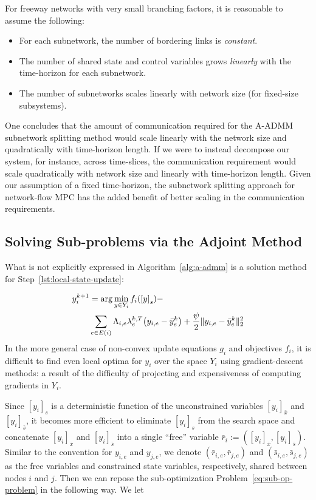 For freeway networks with very small branching factors, it is reasonable to assume the following:

\begin{itemize}
	\item For each subnetwork, the number of bordering links is \emph{constant}.
	\item The number of shared state and control variables grows \emph{linearly} with the time-horizon for each subnetwork.
	\item The number of subnetworks scales linearly with network size (for fixed-size subsystems).
\end{itemize}

 One concludes that the amount of communication required for the A-ADMM subnetwork splitting method would scale linearly with the network size and quadratically with time-horizon length. If we were to instead decompose our system, for instance, across time-slices, the communication requirement would scale quadratically with network size and linearly with time-horizon length. Given our assumption of a fixed time-horizon, the subnetwork splitting approach for network-flow MPC has the added benefit of better scaling in the communication requirements.

\subsection{Solving Sub-problems via the Adjoint Method} %
\label{sec:minimizing_sub_objectives_using_the_adjoint_method}

What is not explicitly expressed in Algorithm~\ref{alg:a-admm} is a solution method for Step~\ref{lst:local-state-update}:

\begin{align}
	\label{eq:sub-op-problem}
	y^{k+1}_i & = \arg \min_{y \in Y_i}
        f_i\left(\left[y\right]_{s}\right) - \\
        & \sum_{e \in E\left(i\right)}
        \Lambda_{i,e} \lambda^{k,T}_{e} \left(y_{i,e} - \bar{y}^{k}_{e} \right) +
        \frac{\augterm}{2} \|y_{i,e} - \bar{y}^{k}_{e}\|_2^2 \nonumber
\end{align}
In the more general case of non-convex update equations $g_i$ and objectives $f_i$, it is difficult to find even local optima for $y_i$ over the space $Y_i$ using gradient-descent methods: a result of the difficulty of projecting and expensiveness of computing gradients in $Y_i$.

Since $\left[y_i\right]_{s}$ is a deterministic function of the unconstrained variables $\left[y_i\right]_{\bar{x}}$ and $\left[y_i\right]_{\bar{s}}$, it becomes more efficient to eliminate $\left[y_i\right]_{s}$ from the search space and concatenate $\left[y_i\right]_{\bar{x}}$ and $\left[y_i\right]_{\bar{s}}$ into a single ``free'' variable $\bar{r}_i := \left(\left[y_i\right]_{\bar{x}},\left[y_i\right]_{\bar{s}} \right)$. Similar to the convention for $y_{i,e}$ and $y_{j,e}$, we denote $\left(\bar{r}_{i,e}, \bar{r}_{j,e}\right)$ and $\left(\bar{s}_{i,e}, \bar{s}_{j,e}\right)$ as the free variables and constrained state variables, respectively, shared between nodes $i$ and $j$. Then we can repose the sub-optimization Problem~\eqref{eq:sub-op-problem} in the following way. We let

